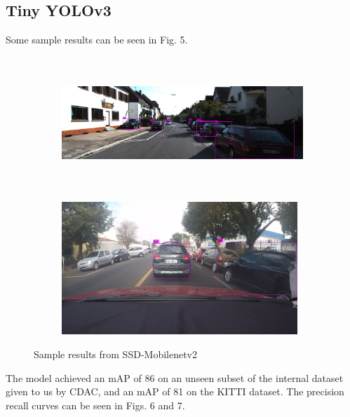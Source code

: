 \documentclass[12pt,letterpaper]{article}
\begin{document}
\subsection{Tiny YOLOv3}

Some sample results can be seen in Fig. 5.

\begin{figure}[H]
    \centering
    \begin{subfigure}{0.45\textwidth}
        \includegraphics[width = 0.9\linewidth,height=5cm]{assets/yolo_fig1.jpg}
        \caption{}
    \end{subfigure}
    \begin{subfigure}{0.45\textwidth}
        \includegraphics[width=0.9\linewidth,height=5cm]{assets/yolo_fig2.jpg}
        \caption{}
    \end{subfigure}
    \caption{Sample results from SSD-Mobilenetv2}
\end{figure}

The model achieved an mAP of 86 on an unseen subset of the internal dataset given to us by CDAC, and an mAP of 81 on the KITTI dataset. The precision recall curves can be seen in Figs. 6 and 7.
\end{document}
